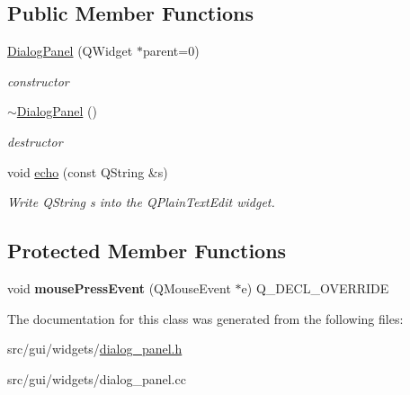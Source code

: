 \subsection*{Public Member Functions}
\begin{DoxyCompactItemize}
\item 
\hyperlink{classgui_1_1DialogPanel_a38fc88cf71917935c2bd6275632ed019}{Dialog\+Panel} (Q\+Widget $\ast$parent=0)\hypertarget{classgui_1_1DialogPanel_a38fc88cf71917935c2bd6275632ed019}{}\label{classgui_1_1DialogPanel_a38fc88cf71917935c2bd6275632ed019}

\begin{DoxyCompactList}\small\item\em constructor \end{DoxyCompactList}\item 
\hyperlink{classgui_1_1DialogPanel_acfabd30363c9b93de4bb5f098a602ad7}{$\sim$\+Dialog\+Panel} ()\hypertarget{classgui_1_1DialogPanel_acfabd30363c9b93de4bb5f098a602ad7}{}\label{classgui_1_1DialogPanel_acfabd30363c9b93de4bb5f098a602ad7}

\begin{DoxyCompactList}\small\item\em destructor \end{DoxyCompactList}\item 
void \hyperlink{classgui_1_1DialogPanel_a584e9355ed1c9dff754b2682075365b8}{echo} (const Q\+String \&s)\hypertarget{classgui_1_1DialogPanel_a584e9355ed1c9dff754b2682075365b8}{}\label{classgui_1_1DialogPanel_a584e9355ed1c9dff754b2682075365b8}

\begin{DoxyCompactList}\small\item\em Write Q\+String s into the Q\+Plain\+Text\+Edit widget. \end{DoxyCompactList}\end{DoxyCompactItemize}
\subsection*{Protected Member Functions}
\begin{DoxyCompactItemize}
\item 
void {\bfseries mouse\+Press\+Event} (Q\+Mouse\+Event $\ast$e) Q\+\_\+\+D\+E\+C\+L\+\_\+\+O\+V\+E\+R\+R\+I\+DE\hypertarget{classgui_1_1DialogPanel_a1b9636870f3995c453e2bb9176940e88}{}\label{classgui_1_1DialogPanel_a1b9636870f3995c453e2bb9176940e88}

\end{DoxyCompactItemize}


The documentation for this class was generated from the following files\+:\begin{DoxyCompactItemize}
\item 
src/gui/widgets/\hyperlink{dialog__panel_8h}{dialog\+\_\+panel.\+h}\item 
src/gui/widgets/dialog\+\_\+panel.\+cc\end{DoxyCompactItemize}
